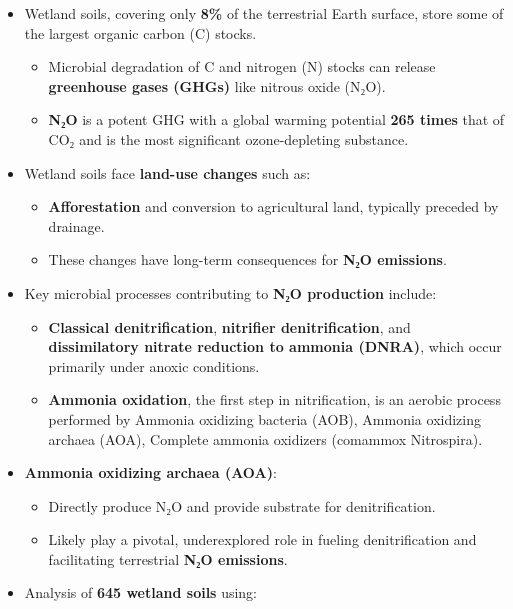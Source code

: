 \documentclass[
]{article}
\providecommand{\tightlist}{%
  \setlength{\itemsep}{0pt}\setlength{\parskip}{0pt}}
\begin{document}
\begin{itemize}
\tightlist
\item
  Wetland soils, covering only \textbf{8\%} of the terrestrial Earth
  surface, store some of the largest organic carbon (C) stocks.

  \begin{itemize}
  \tightlist
  \item
    Microbial degradation of C and nitrogen (N) stocks can release
    \textbf{greenhouse gases (GHGs)} like nitrous oxide (N₂O).
  \item
    \textbf{N₂O} is a potent GHG with a global warming potential
    \textbf{265 times} that of CO₂ and is the most significant
    ozone-depleting substance.
  \end{itemize}
\item
  Wetland soils face \textbf{land-use changes} such as:

  \begin{itemize}
  \tightlist
  \item
    \textbf{Afforestation} and conversion to agricultural land,
    typically preceded by drainage.
  \item
    These changes have long-term consequences for \textbf{N₂O
    emissions}.
  \end{itemize}
\item
  Key microbial processes contributing to \textbf{N₂O production}
  include:

  \begin{itemize}
  \tightlist
  \item
    \textbf{Classical denitrification}, \textbf{nitrifier
    denitrification}, and \textbf{dissimilatory nitrate reduction to
    ammonia (DNRA)}, which occur primarily under anoxic conditions.
  \item
    \textbf{Ammonia oxidation}, the first step in nitrification, is an
    aerobic process performed by Ammonia oxidizing bacteria (AOB),
    Ammonia oxidizing archaea (AOA), Complete ammonia oxidizers
    (comammox Nitrospira).
  \end{itemize}
\item
  \textbf{Ammonia oxidizing archaea (AOA)}:

  \begin{itemize}
  \tightlist
  \item
    Directly produce N₂O and provide substrate for denitrification.
  \item
    Likely play a pivotal, underexplored role in fueling denitrification
    and facilitating terrestrial \textbf{N₂O emissions}.
  \end{itemize}
\item
  Analysis of \textbf{645 wetland soils} using:


\end{itemize}
\end{document}
